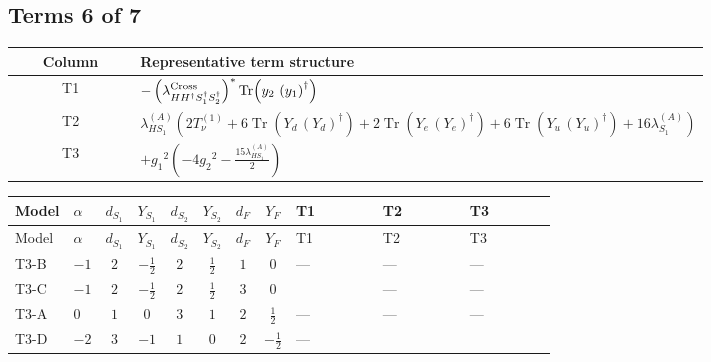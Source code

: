 \documentclass[8pt]{article}
\begin{document}
\begin{landscape}
\subsection*{Terms 6 of 7}
\begin{center}
\begin{tabular}{@{}c >{\raggedright\arraybackslash}p{0.82\linewidth}@{}}
\toprule
Column & Representative term structure \\
\midrule
T1 & \(\displaystyle -\left({\lambda_{H H^\dagger S_1^\dagger S_2^\dagger}^{\rm Cross}}\right)^{*} \operatorname{Tr}\!\left({y_2}\,\left({y_1}\right)^{\dagger}\right)\) \\
\midrule
T2 & \(\displaystyle {\lambda_{HS_1}^{(A)}} (2 T_{\nu}^{(1)}+6 \operatorname{Tr}\!\left({Y_d}\,\left({Y_d}\right)^{\dagger}\right)+2 \operatorname{Tr}\!\left({Y_e}\,\left({Y_e}\right)^{\dagger}\right)+6 \operatorname{Tr}\!\left({Y_u}\,\left({Y_u}\right)^{\dagger}\right)+16 {\lambda_{S_1}^{(A)}})\) \\
\midrule
T3 & \(\displaystyle +{g_1}^2 \left(-4 {g_2}^2-\frac{15 {\lambda_{HS_1}^{(A)}}}{2}\right)\) \\
\midrule
\bottomrule
\end{tabular}
\end{center}
\smallskip
\tiny
\begin{longtable}{@{}llcccccc >{\raggedright\arraybackslash}p{0.21\linewidth} >{\raggedright\arraybackslash}p{0.21\linewidth} >{\raggedright\arraybackslash}p{0.21\linewidth}@{}}
\toprule
Model & $\alpha$ & $d_{S_1}$ & $Y_{S_1}$ & $d_{S_2}$ & $Y_{S_2}$ & $d_F$ & $Y_F$ & T1 & T2 & T3 \\
\midrule
\endfirsthead
\toprule
Model & $\alpha$ & $d_{S_1}$ & $Y_{S_1}$ & $d_{S_2}$ & $Y_{S_2}$ & $d_F$ & $Y_F$ & T1 & T2 & T3 \\
\midrule
\endhead
T3-B & $-1$ & $2$ & $-\frac{1}{2}$ & $2$ & $\frac{1}{2}$ & $1$ & $0$ & --- & --- & --- \\
\midrule
T3-C & $-1$ & $2$ & $-\frac{1}{2}$ & $2$ & $\frac{1}{2}$ & $3$ & $0$ & \scriptsize\adjustbox{max width=\linewidth}{$\begin{gathered} -\left({\lambda_{H H^\dagger S_1^\dagger S_2^\dagger}^{\rm Cross}}\right)^{*} \operatorname{Tr}\!\left({y_2}\,\left({y_1}\right)^{\dagger}\right)\end{gathered}$} & --- & --- \\
\midrule
T3-A & $0$ & $1$ & $0$ & $3$ & $1$ & $2$ & $\frac{1}{2}$ & --- & --- & --- \\
\midrule
T3-D & $-2$ & $3$ & $-1$ & $1$ & $0$ & $2$ & $-\frac{1}{2}$ & --- & \scriptsize\adjustbox{max width=\linewidth}{$\begin{gathered} {\lambda_{HS_1}^{(A)}} (2 T_{\nu}^{(1)}+6 \operatorname{Tr}\!\left({Y_d}\,\left({Y_d}\right)^{\dagger}\right)+2 \operatorname{Tr}\!\left({Y_e}\,\left({Y_e}\right)^{\dagger}\right)+6 \operatorname{Tr}\!\left({Y_u}\,\left({Y_u}\right)^{\dagger}\right)+16 {\lambda_{S_1}^{(A)}})\end{gathered}$} & \scriptsize\adjustbox{max width=\linewidth}{$\begin{gathered} +{g_1}^2 \left(-4 {g_2}^2-\frac{15 {\lambda_{HS_1}^{(A)}}}{2}\right)\end{gathered}$} \\

\end{longtable}
\end{landscape}
\end{document}

